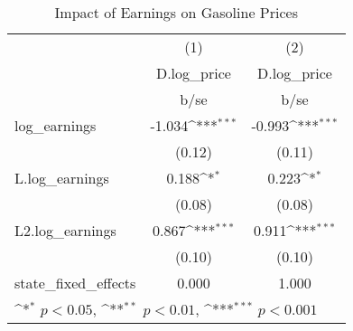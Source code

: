 \begin{table}[htbp]\centering
\def\sym#1{\ifmmode^{#1}\else\(^{#1}\)\fi}
\caption{Impact of Earnings on Gasoline Prices}
\begin{tabular}{l*{2}{c}}
\hline\hline
            &\multicolumn{1}{c}{(1)}&\multicolumn{1}{c}{(2)}\\
            &\multicolumn{1}{c}{D.log\_price}&\multicolumn{1}{c}{D.log\_price}\\
            &        b/se         &        b/se         \\
\hline
log\_earnings&      -1.034\sym{***}&      -0.993\sym{***}\\
            &      (0.12)         &      (0.11)         \\
L.log\_earnings&       0.188\sym{*}  &       0.223\sym{*}  \\
            &      (0.08)         &      (0.08)         \\
L2.log\_earnings&       0.867\sym{***}&       0.911\sym{***}\\
            &      (0.10)         &      (0.10)         \\
\hline
state\_fixed\_effects&       0.000         &       1.000         \\
\hline\hline
\multicolumn{3}{l}{\footnotesize \sym{*} \(p<0.05\), \sym{**} \(p<0.01\), \sym{***} \(p<0.001\)}\\
\end{tabular}
\end{table}
